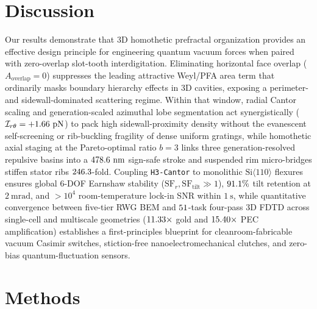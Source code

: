 \documentclass[pdflatex,sn-nature]{sn-jnl}
\begin{document}
\section*{Discussion}
\label{sec:discussion}

Our results demonstrate that 3D homothetic prefractal organization provides an effective design principle for engineering quantum vacuum forces when paired with zero-overlap slot-tooth interdigitation. Eliminating horizontal face overlap ($A_{\mathrm{overlap}}=0$) suppresses the leading attractive Weyl/PFA area term that ordinarily masks boundary hierarchy effects in 3D cavities\cite{kennethklich2006,lapidus1991}, exposing a perimeter- and sidewall-dominated scattering regime\cite{levin2010}. Within that window, radial Cantor scaling and generation-scaled azimuthal lobe segmentation act synergistically ($\mathcal{I}_{r\theta} = +1.66{}\ \mathrm{pN}$) to pack high sidewall-proximity density without the evanescent self-screening or rib-buckling fragility of dense uniform gratings, while homothetic axial staging at the Pareto-optimal ratio $b=3$ links three generation-resolved repulsive basins into a $478.6{}\ \mathrm{nm}$ sign-safe stroke and suspended rim micro-bridges stiffen stator ribs $246.3{}$-fold. Coupling \texttt{H3-Cantor} to monolithic $\mathrm{Si}\langle 110\rangle$ flexures ensures global 6-DOF Earnshaw stability ($\mathrm{SF}_r, \mathrm{SF}_{\mathrm{tilt}} \gg 1$), $91.1{}\%$ tilt retention at $2\ \mathrm{mrad}$, and $>10^4$ room-temperature lock-in SNR within $1\ \mathrm{s}$, while quantitative convergence between five-tier RWG BEM and $51{}$-task four-pass 3D FDTD across single-cell and multiscale geometries ($11.33{}\times$ gold and $15.40{}\times$ PEC amplification) establishes a first-principles blueprint for cleanroom-fabricable vacuum Casimir switches, stiction-free nanoelectromechanical clutches, and zero-bias quantum-fluctuation sensors\cite{safronova2018,lodahl2015}.

\backmatter

\section*{Methods}
\label{sec:methods}
\end{document}
